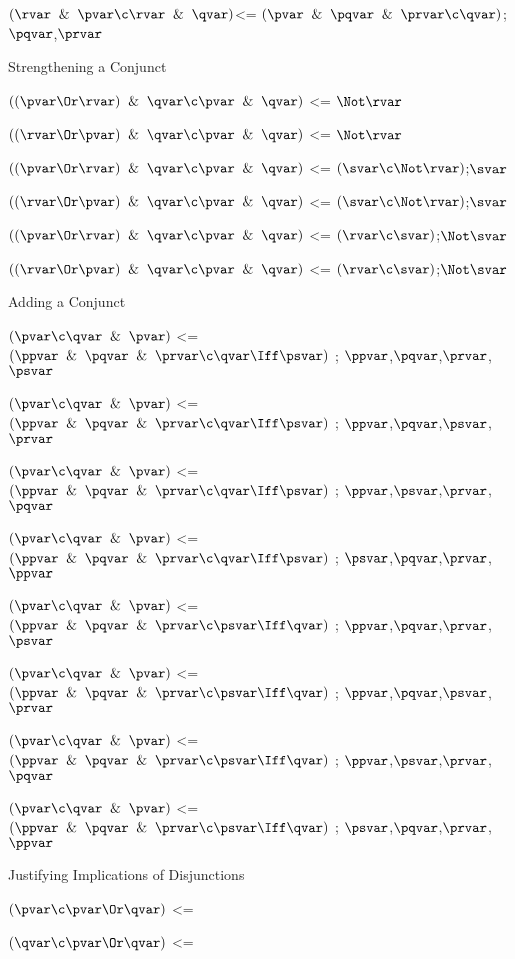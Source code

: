 $(\rvar \And \pvar \c \rvar \And \qvar)$<= $(\pvar \And \pqvar \And \prvar \c \qvar)$;$\pqvar$,$\prvar$

Strengthening a Conjunct

$((\pvar \Or \rvar)\And \qvar \c \pvar \And \qvar)$ <= $\Not \rvar$

$((\rvar \Or \pvar)\And \qvar \c \pvar \And \qvar)$ <= $\Not \rvar$

$((\pvar \Or \rvar)\And \qvar \c \pvar \And \qvar)$ <= $(\svar \c \Not \rvar)$;$\svar$

$((\rvar \Or \pvar)\And \qvar \c \pvar \And \qvar)$ <= $(\svar \c \Not \rvar)$;$\svar$

$((\pvar \Or \rvar)\And \qvar \c \pvar \And \qvar)$ <= $(\rvar \c  \svar)$;$\Not\svar$

$((\rvar \Or \pvar)\And \qvar \c \pvar \And \qvar)$ <= $(\rvar \c  \svar)$;$\Not\svar$

\lineb

Adding a Conjunct

$(\pvar \c \qvar \And \pvar)$ <= $(\ppvar \And \pqvar \And \prvar \c \qvar \Iff \psvar)$ ; $\ppvar$,$\pqvar$,$\prvar$,$\psvar$

$(\pvar \c \qvar \And \pvar)$ <= $(\ppvar \And \pqvar \And \prvar \c \qvar \Iff \psvar)$ ; $\ppvar$,$\pqvar$,$\psvar$,$\prvar$

$(\pvar \c \qvar \And \pvar)$ <= $(\ppvar \And \pqvar \And \prvar \c \qvar \Iff \psvar)$ ; $\ppvar$,$\psvar$,$\prvar$,$\pqvar$

$(\pvar \c \qvar \And \pvar)$ <= $(\ppvar \And \pqvar \And \prvar \c \qvar \Iff \psvar)$ ; $\psvar$,$\pqvar$,$\prvar$,$\ppvar$

$(\pvar \c \qvar \And \pvar)$ <= $(\ppvar \And \pqvar \And \prvar \c \psvar \Iff \qvar)$ ; $\ppvar$,$\pqvar$,$\prvar$,$\psvar$

$(\pvar \c \qvar \And \pvar)$ <= $(\ppvar \And \pqvar \And \prvar \c \psvar \Iff \qvar)$ ; $\ppvar$,$\pqvar$,$\psvar$,$\prvar$

$(\pvar \c \qvar \And \pvar)$ <= $(\ppvar \And \pqvar \And \prvar \c \psvar \Iff \qvar)$ ; $\ppvar$,$\psvar$,$\prvar$,$\pqvar$

$(\pvar \c \qvar \And \pvar)$ <= $(\ppvar \And \pqvar \And \prvar \c \psvar \Iff \qvar)$ ; $\psvar$,$\pqvar$,$\prvar$,$\ppvar$
\lineb

Justifying Implications of Disjunctions 
\lineb

$(\pvar \c \pvar \Or \qvar)$ <=

$(\qvar \c \pvar \Or \qvar)$ <=

